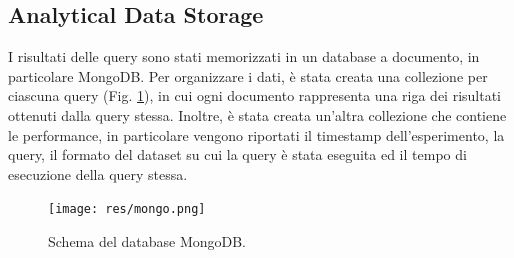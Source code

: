 \documentclass[conference]{IEEEtran}
\begin{document}
\subsection{Analytical Data Storage}
I risultati delle query sono stati memorizzati in un database a documento, in particolare MongoDB.
Per organizzare i dati, è stata creata una collezione per ciascuna query (Fig. \ref{fig:mongo}), in cui ogni documento rappresenta una riga dei risultati ottenuti dalla query stessa. Inoltre, è stata creata un'altra collezione che contiene le performance, in particolare vengono riportati il timestamp dell'esperimento, la query, il formato del dataset su cui la query è stata eseguita ed il tempo di esecuzione della query stessa.
\begin{figure}[H]
    \centerline{\texttt{[image: res/mongo.png]}}
    \caption{Schema del database MongoDB.}
    \label{fig:mongo}
\end{figure}
\end{document}
